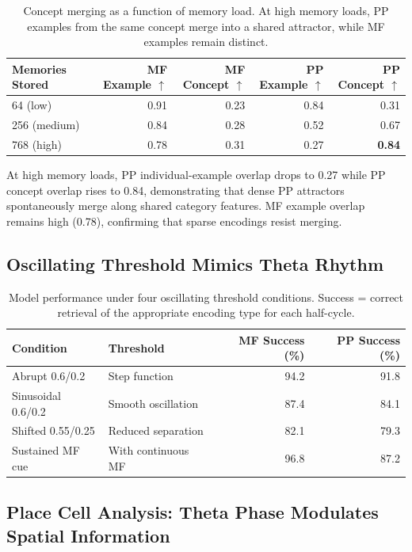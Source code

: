 \documentclass[11pt]{article}
\begin{document}
\begin{table}[H]
\centering
\caption{Concept merging as a function of memory load. At high memory loads, PP examples from the same concept merge into a shared attractor, while MF examples remain distinct.}
\label{tab:capacity}
\begin{tabular}{lrrrr}
\toprule
\textbf{Memories Stored} & \textbf{MF Example $\uparrow$} & \textbf{MF Concept $\uparrow$} & \textbf{PP Example $\uparrow$} & \textbf{PP Concept $\uparrow$} \\
\midrule
64 (low) & 0.91 & 0.23 & 0.84 & 0.31 \\
256 (medium) & 0.84 & 0.28 & 0.52 & 0.67 \\
768 (high) & 0.78 & 0.31 & 0.27 & \textbf{0.84} \\
\bottomrule
\end{tabular}
\end{table}

At high memory loads, PP individual-example overlap drops to 0.27 while PP concept overlap rises to 0.84, demonstrating that dense PP attractors spontaneously merge along shared category features. MF example overlap remains high (0.78), confirming that sparse encodings resist merging.

\subsection{Oscillating Threshold Mimics Theta Rhythm}

\begin{table}[H]
\centering
\caption{Model performance under four oscillating threshold conditions. Success = correct retrieval of the appropriate encoding type for each half-cycle.}
\label{tab:theta}
\begin{tabular}{llrr}
\toprule
\textbf{Condition} & \textbf{Threshold} & \textbf{MF Success (\%)} & \textbf{PP Success (\%)} \\
\midrule
Abrupt 0.6/0.2 & Step function & 94.2 & 91.8 \\
Sinusoidal 0.6/0.2 & Smooth oscillation & 87.4 & 84.1 \\
Shifted 0.55/0.25 & Reduced separation & 82.1 & 79.3 \\
Sustained MF cue & With continuous MF & 96.8 & 87.2 \\
\bottomrule
\end{tabular}
\end{table}

\subsection{Place Cell Analysis: Theta Phase Modulates Spatial Information}
\end{document}
